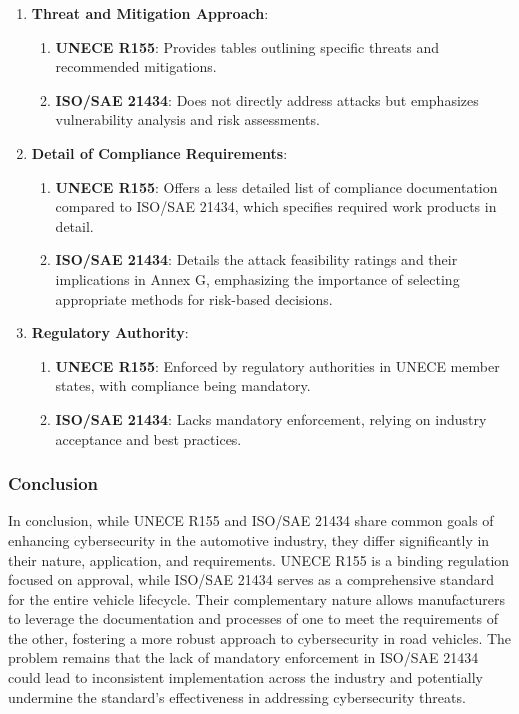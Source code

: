 \begin{enumerate}
    \item \textbf{Threat and Mitigation Approach}:
    \begin{enumerate}
        \item \textbf{UNECE R155}: Provides tables outlining specific threats and recommended mitigations.
        \item \textbf{ISO/SAE 21434}: Does not directly address attacks but emphasizes vulnerability analysis and risk assessments.
    \end{enumerate}

    \item \textbf{Detail of Compliance Requirements}:
    \begin{enumerate}
        \item \textbf{UNECE R155}: Offers a less detailed list of compliance documentation compared to ISO/SAE 21434, which specifies required work products in detail.
        \item \textbf{ISO/SAE 21434}: Details the attack feasibility ratings and their implications in Annex G, emphasizing the importance of selecting appropriate methods for risk-based decisions.
    \end{enumerate}

    \item \textbf{Regulatory Authority}:
    \begin{enumerate}
        \item \textbf{UNECE R155}: Enforced by regulatory authorities in UNECE member states, with compliance being mandatory.
        \item \textbf{ISO/SAE 21434}: Lacks mandatory enforcement, relying on industry acceptance and best practices.
    \end{enumerate}
\end{enumerate}

\subsubsection{Conclusion}\label{subsubsec:conclusion2}

In conclusion, while UNECE R155 and ISO/SAE 21434 share common goals of enhancing cybersecurity in the automotive industry, they differ significantly in their nature, application, and requirements.
UNECE R155 is a binding regulation focused on approval, while ISO/SAE 21434 serves as a comprehensive standard for the entire vehicle lifecycle.
Their complementary nature allows manufacturers to leverage the documentation and processes of one to meet the requirements of the other,
fostering a more robust approach to cybersecurity in road vehicles\cite{comparison-standard}.
The problem remains that the lack of mandatory enforcement in ISO/SAE 21434 could lead to inconsistent implementation across the industry and potentially undermine the standard's effectiveness in addressing cybersecurity threats.